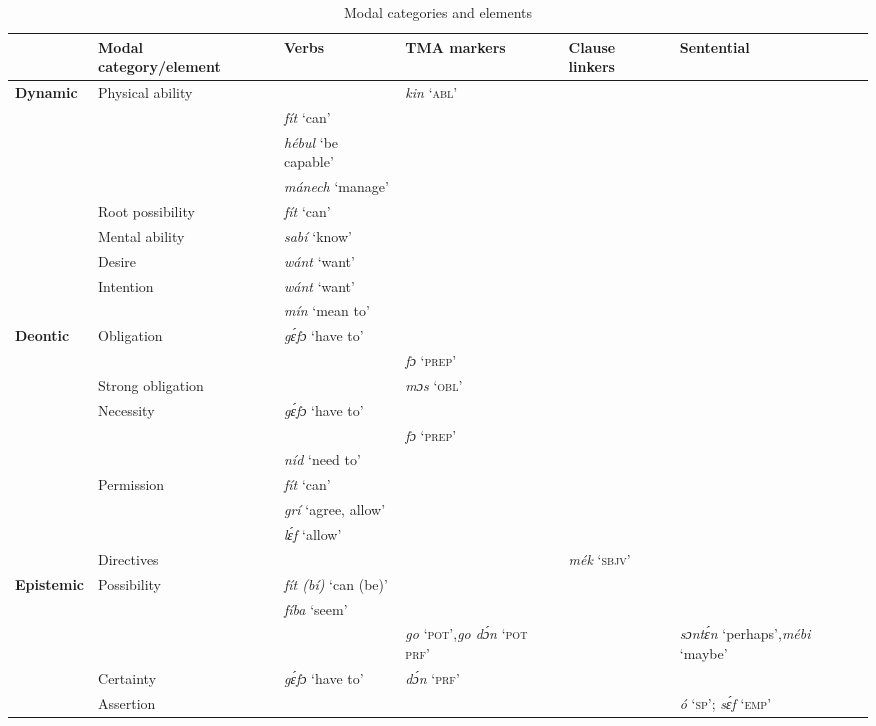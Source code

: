 \begin{sidewaystable}
\caption{Modal categories and elements}
\label{tab:key:6.8}
\footnotesize
\begin{tabularx}{\textwidth}{llQQQQ}
\lsptoprule
&Modal category/element & Verbs  & TMA markers & Clause linkers & Sentential \\
\midrule 
\textbf{Dynamic} & Physical ability &  & \textit{kin} {‘}{\textsc{abl’}} &  & \\
&& \textit{fít} {‘can’} &  &  & \\
&& \textit{hébul} {‘be capable’} &  &  & \\
&& \textit{mánech} {‘manage’} &  &  & \\
&Root possibility & \textit{fít} {‘can’} &  &  & \\
&Mental ability & \textit{sabí}{ ‘know’} &  &  & \\
&Desire & \textit{wánt} {‘want’} &  &  & \\
&Intention & \textit{wánt} {‘want’} &  &  & \\
&& \textit{mín} {‘mean to’} &  &  & \\

\midrule
\textbf{Deontic} &   Obligation & \textit{gɛ́fɔ} ‘have to’ &  &  & \\
&&  & \textit{fɔ} {‘}{\textsc{prep}}{’} &  & \\
&Strong obligation &  & \textit{mɔs} ‘\textsc{obl}’ &  & \\
&Necessity & \textit{gɛ́fɔ} ‘have to’ &  &  & \\
&&  & \textit{fɔ} {‘}{\textsc{prep}}{’} &  & \\
&& \textit{níd} {‘need to’} &  &  & \\
&Permission & \textit{fít} {‘can’} &  &  & \\
&& \textit{grí} {‘agree, allow}’ &  &  & \\
&& \textit{lɛ́f} ‘allow’ &  &  & \\
&Directives &  &  & \textit{mék} {‘}{\textsc{sbjv}}{’} & \\

\midrule
\textbf{Epistemic} & Possibility & \textit{fít (bí)} {‘can} {(be)’} &  &  & \\
&& \textit{fíba} {‘seem’} &  &  & \\
&&  & \textit{go} {‘}{\textsc{pot}}{’,}\newline  \textit{go dɔ́n}\textit{} {‘}{\textsc{pot}}{} {\textsc{prf}}{’} &  & \textit{sɔntɛ́n} ‘perhaps’,\newline  \textit{m\'ebi} ‘maybe’\\
&Certainty & \textit{gɛ́fɔ} ‘have to’ & \textit{dɔ́n} {‘}{\textsc{prf}}{’} &  & \\
&Assertion &  &  &  & \textit{ó} ‘\textsc{sp}’; \textit{sɛ́f} ‘\textsc{emp}’ \\


\end{tabularx}
\end{sidewaystable}
